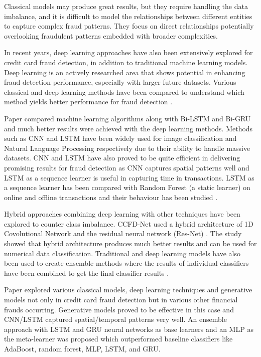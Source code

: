 \documentclass[pdflatex,sn-mathphys-num]{sn-jnl}%
\begin{document}
Classical models may produce great results, but they require handling the data imbalance, and it is difficult to model the relationships between different entities to capture complex fraud patterns. They focus on direct relationships potentially overlooking fraudulent patterns embedded with broader complexities.

In recent years, deep learning approaches have also been extensively explored for credit card fraud detection, in addition to traditional machine learning models. Deep learning is an actively researched area that shows potential in enhancing fraud detection performance, especially with larger future datasets.
Various classical and deep learning methods have been compared to understand which method yields better performance for fraud detection \cite{alarfaj2022credit}.

Paper \cite{hassan2020} compared machine learning algorithms along with Bi-LSTM and Bi-GRU and much better results were achieved with the deep learning methods. Methods such as CNN and LSTM have been widely used for image classification and Natural Language Processing respectively due to their ability to handle massive datasets. CNN and LSTM have also proved to be quite efficient in delivering promising results for fraud detection as CNN captures spatial patterns well and LSTM as a sequence learner is useful in capturing time in transactions\cite{nguyen2020}. LSTM as a sequence learner has been compared with Random Forest (a static learner) on online and offline transactions and their behaviour has been studied \cite{jurgovsky2018}.

Hybrid approaches combining deep learning with other techniques have been explored to counter class imbalance. CCFD-Net used a hybrid architecture of 1D Covolutional Network and the residual neural network (Res-Net) \cite{liu2021}. The study showed that hybrid architecture produces much better results and can be used for numerical data classification. Traditional and deep learning models have also been used to create ensemble methods where the results of individual classifiers have been combined to get the final classifier results \cite{sahithi2022} \cite{sohony2018}.

Paper \cite{hilal2022} explored various classical models, deep learning techniques and generative models not only in credit card fraud detection but in various other financial frauds occurring. Generative models proved to be effective in this case and CNN/LSTM captured spatial/temporal patterns very well. An ensemble approach with LSTM and GRU neural networks as base learners and an MLP as the meta-learner was proposed \cite{mienye2023} which outperformed baseline classifiers like AdaBoost, random forest, MLP, LSTM, and GRU.
\end{document}

